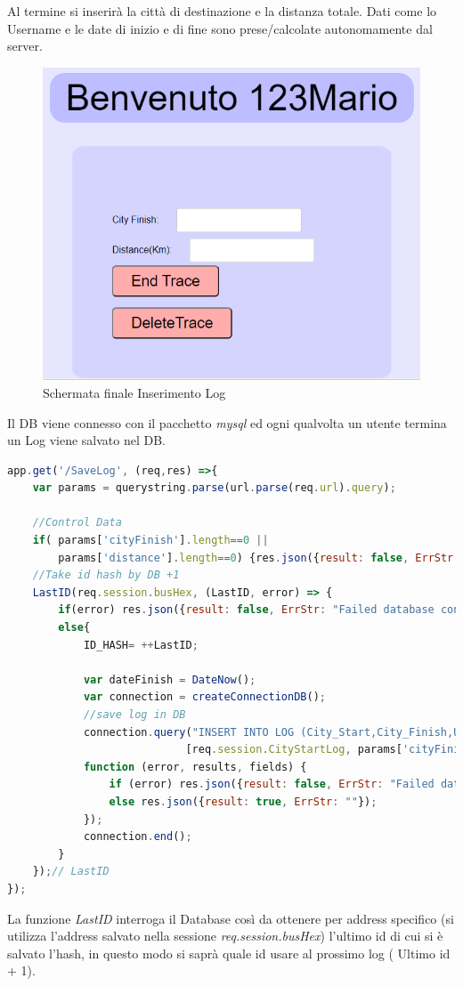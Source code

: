 \documentclass[11pt,a4paper,titlepage,twoside,openright]{report}
\begin{document}
Al termine si inserirà la città di destinazione e la distanza totale. Dati come lo Username e le date di inizio e di fine sono prese/calcolate autonomamente dal server.
\begin{figure}[h]
	\includegraphics[width=\textwidth]{End_Log}
	\centering
	\caption{Schermata finale Inserimento Log}
	\label{fig:End_Log}
\end{figure}
Il DB viene connesso con il pacchetto \textit{mysql} ed ogni qualvolta un utente termina un Log viene salvato nel DB.
\begin{lstlisting}[language=JavaScript]
app.get('/SaveLog', (req,res) =>{
	var params = querystring.parse(url.parse(req.url).query);

	//Control Data
	if( params['cityFinish'].length==0 ||
		params['distance'].length==0) {res.json({result: false, ErrStr: "Campo/i Mancante"});return;}
	//Take id hash by DB +1
	LastID(req.session.busHex, (LastID, error) => {
		if(error) res.json({result: false, ErrStr: "Failed database connection " + error});
		else{
	  		ID_HASH= ++LastID;

	  		var dateFinish = DateNow();
	  		var connection = createConnectionDB();
		  	//save log in DB
		  	connection.query("INSERT INTO LOG (City_Start,City_Finish,UserName,Distance,DataStart,DataFinish,ID_HASH) VALUES(?,?,?,?,?,?,?)",
		  					[req.session.CityStartLog, params['cityFinish'], req.session.username, params['distance'], req.session.DateStartLog, dateFinish, ID_HASH ],
		  	function (error, results, fields) {
		  		if (error) res.json({result: false, ErrStr: "Failed database connection " + error});
		  		else res.json({result: true, ErrStr: ""});
			});
			connection.end();
	  	}
	});// LastID
});
\end{lstlisting}
La funzione \textit{LastID} interroga il Database così da ottenere per address specifico (si utilizza l'address salvato nella sessione \textit{req.session.busHex}) l'ultimo id di cui si è salvato l'hash, in questo modo si saprà quale id usare al prossimo log ( Ultimo id + 1).
\end{document}
